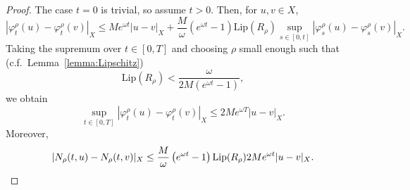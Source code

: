 \documentclass[10pt,a4paper]{amsart}
\newcommand{\lip}{\mathrm{Lip}}
\begin{document}
\begin{proof}
    The case $t =0$ is trivial, so assume $t > 0$.
    Then, for $u,v \in X$,
    \begin{displaymath}
        |\varphi_t^\rho (u) - \varphi_t^\rho(v)|_X \leq Me^{\omega t}  |u-v|_X + \frac{M}{\omega} \left( e^{\omega t} - 1 \right) \lip(R_\rho) \sup_{s \in [0,t]}  |\varphi_s^\rho (u) - \varphi_s^\rho(v)|_X.
    \end{displaymath}
    Taking the supremum over $t \in [0,T]$ and choosing $\rho$ small enough such that (c.f.\ Lemma~\ref{lemma:Lipschitz})
    \begin{equation}
        \lip(R_\rho) < \frac{\omega}{ 2 M \left( e^{\omega t} - 1 \right)},
        \label{eq:replaced}
    \end{equation}
    we obtain 
    \begin{displaymath}
        \sup_{t \in [0,T]} |\varphi_t^\rho (u) - \varphi_t^\rho(v)|_X \leq 2Me^{\omega T}  |u-v|_X .
    \end{displaymath}
    Moreover, 
    \begin{displaymath}
        |N_\rho(t,u ) - N_\rho(t,v)|_X \leq \frac{M}{\omega} \left( e^{\omega t} - 1 \right) \lip(R_\rho) 2Me^{\omega t}  |u-v|_X. \qedhere
    \end{displaymath}
\end{proof}
\end{document}
